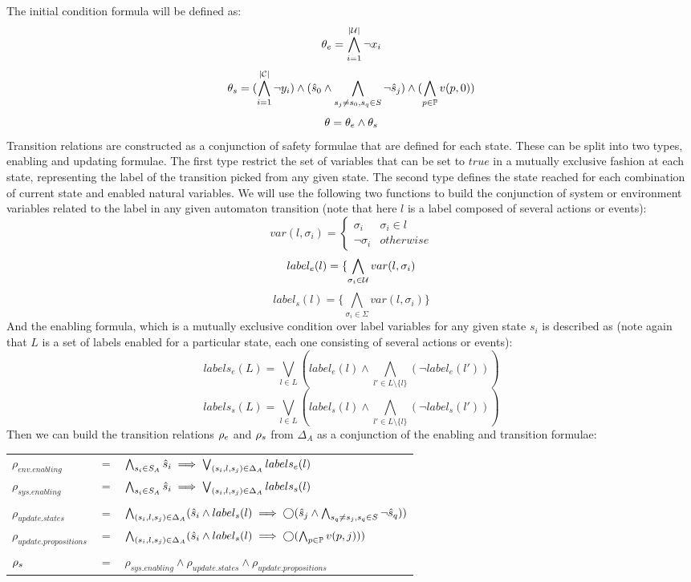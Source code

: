 The initial condition formula will be defined as:
\[{\theta_e} = \bigwedge_{i = 1}^{|{\mathcal{U}}|}\neg x_i\]
\[{\theta_s} = (\bigwedge_{i = 1}^{|\mathcal{C}|}\neg y_i) \wedge (\hat{s}_{0} \wedge\bigwedge_{s_j \neq s_0, s_q \in S}\neg \hat{s}_{j}) \wedge (\bigwedge_{{p} \in {\mathbb{P}}}v({p},0))\]
\[\theta = {\theta_e} \wedge {\theta_s}\]
Transition relations are constructed as a conjunction of safety formulae that are defined for each state. These can be split into two types, enabling and updating formulae. The first type restrict the set of variables that can be set to $true$ in a mutually exclusive fashion at each state, representing the label of the transition picked from any given state. The second type defines the state reached for each combination of current state and enabled natural variables. 
We will use the following two functions to build the conjunction of system or environment variables related to the label in any given automaton transition (note that here $l$ is a label composed of several actions or events):
\[
var(l, \sigma_i) = \begin{cases}
\sigma_i & \sigma_i \in l \\
\neg \sigma_i & otherwise
\end{cases}
\]
\[label_e(l) = \{\bigwedge_{\sigma_i \in {\mathcal{U}}}var(l, \sigma_i)\]
\[label_s(l) = \{\bigwedge_{\sigma_i \in \Sigma}var(l, \sigma_i)\}\]
And the enabling formula, which is a mutually exclusive condition over label variables for any given state $s_i$ is described as (note again that $L$ is a set of labels enabled for a particular state, each one consisting of several actions or events):
\[labels_e(L) = \bigvee_{l \in L}(label_e(l) \wedge \bigwedge_{l' \in L \setminus \{l\}}(\neg label_e(l')) ) \]
\[labels_s(L) = \bigvee_{l \in L}(label_s(l) \wedge \bigwedge_{l' \in L \setminus \{l\}}(\neg label_s(l')) ) \]
Then we can build the transition relations ${\rho_e}$ and ${\rho_s}$ from $\Delta_A$ as a conjunction of the enabling and transition formulae:

\vspace{1em}
\begin{tabular}{ l c l }
	$\rho_{env.enabling}$ &$=$& $\bigwedge_{s_i \in S_A} \hat{s}_{i} \implies \bigvee_{(s_i,l,s_j) \in \Delta_A}labels_e(l)$\\
	$\rho_{sys.enabling}$ &$=$& $\bigwedge_{s_i \in S_A} \hat{s}_{i} \implies \bigvee_{(s_i,l,s_j) \in \Delta_A}labels_s(l)$\\
	&&\\
	$\rho_{update.states}$&$=$&$\bigwedge_{(s_i,l,s_j) \in \Delta_A} (\hat{s}_{i} \wedge label_s(l) \implies \bigcirc(\hat{s}_{j} \wedge\bigwedge_{s_q \neq s_j, s_q \in S}\neg \hat{s}_{q}) ) $\\
	$\rho_{update.propositions}$&$=$&$\bigwedge_{(s_i,l,s_j) \in \Delta_A} (\hat{s}_{i} \wedge label_s(l) \implies \bigcirc(\bigwedge_{{p} \in {\mathbb{P}}}v({p},j) ) )$\\
	&&\\
	${\rho_s}$&$=$&$\rho_{sys.enabling} \wedge  \rho_{update.states} \wedge  \rho_{update.propositions}$\\	
\end{tabular}
\vspace{1em}

